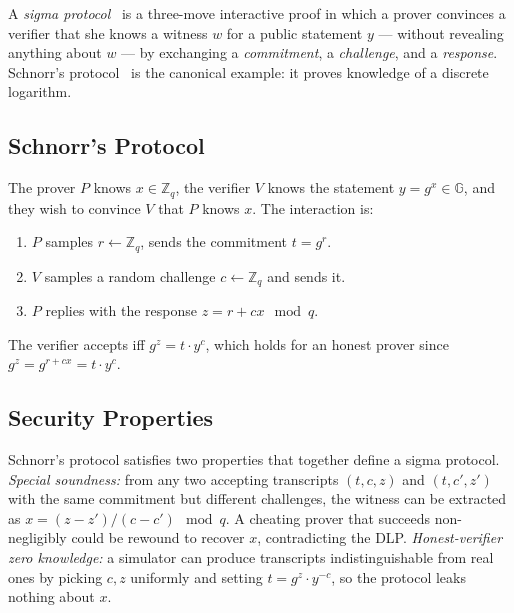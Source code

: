 \documentclass[12pt,a4paper,oneside]{report}
\begin{document}
A \textit{sigma protocol}~\cite{cramer-damgard} is a three-move interactive 
proof in which a prover convinces a verifier that she knows a witness $w$ 
for a public statement $y$ --- without revealing anything about $w$ --- by 
exchanging a \textit{commitment}, a \textit{challenge}, and a \textit{response}. 
Schnorr's protocol~\cite{schnorr} is the canonical example: it proves 
knowledge of a discrete logarithm.

\subsection*{Schnorr's Protocol}
The prover $P$ knows $x \in \mathbb{Z}_q$, the verifier $V$ knows the 
statement $y = g^x \in \mathbb{G}$, and they wish to convince $V$ that 
$P$ knows $x$. The interaction is:
\begin{enumerate}
    \item $P$ samples $r \leftarrow \mathbb{Z}_q$, sends the commitment 
    $t = g^r$.
    \item $V$ samples a random challenge $c \leftarrow \mathbb{Z}_q$ and 
    sends it.
    \item $P$ replies with the response $z = r + c x \mod q$.
\end{enumerate}
The verifier accepts iff $g^z = t \cdot y^c$, which holds for an honest 
prover since $g^z = g^{r + cx} = t \cdot y^c$.

\subsection*{Security Properties}
Schnorr's protocol satisfies two properties that together define a sigma 
protocol. \textit{Special soundness:} from any two accepting transcripts 
$(t, c, z)$ and $(t, c', z')$ with the same commitment but different 
challenges, the witness can be extracted as $x = (z - z') / (c - c') \mod q$. 
A cheating prover that succeeds non-negligibly could be rewound to recover 
$x$, contradicting the DLP. \textit{Honest-verifier zero knowledge:} a 
simulator can produce transcripts indistinguishable from real ones by 
picking $c, z$ uniformly and setting $t = g^z \cdot y^{-c}$, so the 
protocol leaks nothing about $x$.
\end{document}
